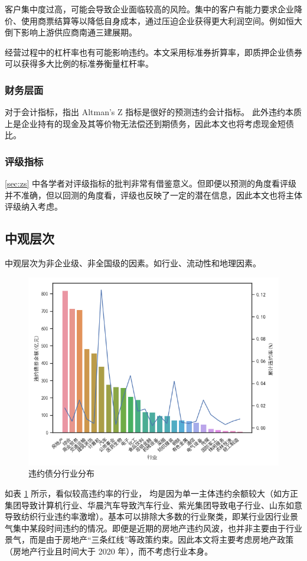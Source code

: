 客户集中度过高，可能会导致企业面临较高的风险\cite{王雄元2017客户集中度与公司债二级市场信用利差}。集中的客户有能力要求企业降价、使用商票结算等以降低自身成本，通过压迫企业获得更大利润空间。例如恒大倒下影响上游供应商南通三建展期。

经营过程中的杠杆率也有可能影响违约\cite{王永钦2019杠杆率如何影响资产价格}。本文采用标准券折算率，即质押企业债券可以获得多大比例的标准券衡量杠杆率。
\subsubsection{财务层面}
对于会计指标，\Textcite{blochlinger2018ratings}指出 Altman's Z 指标是很好的预测违约会计指标。
此外违约本质上是企业持有的现金及其等价物无法偿还到期债务，因此本文也将考虑现金短债比。
\subsubsection{评级指标}
\ref{sec:zs} 中各学者对评级指标的批判非常有借鉴意义。但即便以预测的角度看评级并不准确，但以回测的角度看，评级也反映了一定的潜在信息，因此本文也将主体评级纳入考虑。
\subsection{中观层次}
中观层次为非企业级、非全国级的因素。如行业、流动性和地理因素。

\begin{figure}[htbp]
	\centering
	\includegraphics[width=.9\linewidth]{./data/industry.png}
	\caption{\label{fig:industry}违约债分行业分布}
\end{figure}

如表 \ref{fig:industry} 所示，看似较高违约率的行业，
均是因为单一主体违约余额较大（如方正集团导致计算机行业、华晨汽车导致汽车行业、紫光集团导致电子行业、山东如意导致纺织行业违约率激增）。基本可以排除大多数的行业聚类\cite{azizpour2018exploring}，即某行业因行业景气集中某段时间违约的情况。即便是近期的房地产违约风波，也并非主要由于行业景气，而是由于房地产“三条红线”等政策约束。因此本文将主要考虑房地产政策（房地产行业且时间大于 2020 年），而不考虑行业本身。

